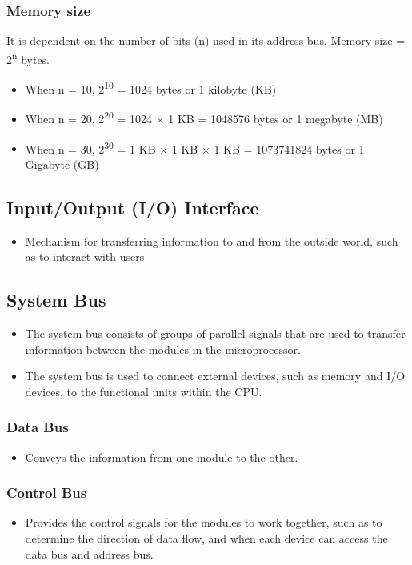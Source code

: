 \documentclass[11pt]{article}
\begin{document}
\subsubsection{Memory size}
\label{sec:orgb8ab323}
It is dependent on the number of bits (n) used in its address bus. Memory size = 2\textsuperscript{n} bytes.

\begin{itemize}
\item When n = 10, 2\textsuperscript{10} = 1024 bytes or 1 kilobyte (KB)
\item When n = 20, 2\textsuperscript{20} = 1024 × 1 KB = 1048576 bytes or 1 megabyte (MB)
\item When n = 30, 2\textsuperscript{30} = 1 KB × 1 KB × 1 KB = 1073741824 bytes or 1 Gigabyte (GB)
\end{itemize}
\subsection{Input/Output (I/O) Interface}
\label{sec:org66d868f}
\begin{itemize}
\item Mechanism for transferring information to and from the outside world, such as to interact with users
\end{itemize}
\subsection{System Bus}
\label{sec:orgd622ca4}
\begin{itemize}
\item The system bus consists of groups of parallel signals that are used to transfer information between the modules in the microprocessor.
\item The system bus is used to connect external devices, such as memory and I/O devices, to the functional units within the CPU.
\end{itemize}
\subsubsection{Data Bus}
\label{sec:orgd7c6fb7}
\begin{itemize}
\item Conveys the information from one module to the other.
\end{itemize}
\subsubsection{Control Bus}
\label{sec:org3d1960b}
\begin{itemize}
\item Provides the control signals for the modules to work together, such as to determine the direction of data flow, and when each device can access the data bus and address bus.
\end{itemize}
\end{document}
